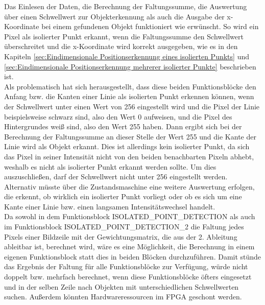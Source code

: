 \documentclass[ngerman,12pt]{article} %
\begin{document}
{Das Einlesen der Daten, die Berechnung der Faltungssumme, die Auswertung über einen Schwellwert zur Objekterkennung als auch die Ausgabe der x-Koordinate bei einem gefundenen Objekt funktioniert wie erwünscht. So wird ein Pixel als isolierter Punkt erkannt, wenn die Faltungssumme den Schwellwert überschreitet und die x-Koordinate wird korrekt ausgegeben, wie es in den Kapiteln \ref{sec:Eindimensionale Positionserkennung eines isolierten Punkts} und \ref{sec:Eindimensionale Positionserkennung mehrerer isolierter Punkte} beschrieben ist.\\
Als problematisch hat sich herausgestellt, dass diese beiden Funktionsblöcke den Anfang bzw. die Kanten einer Linie als isolierten Punkt erkennen können, wenn der Schwellwert unter einen Wert von 256 eingestellt wird und die Pixel der Linie beispielsweise schwarz sind, also den Wert 0 aufweisen, und die Pixel des Hintergrundes weiß sind, also den Wert 255 haben. Dann ergibt sich bei der Berechnung der Faltungssumme an dieser Stelle der Wert 255 und die Kante der Linie wird als Objekt erkannt. Dies ist allerdings kein isolierter Punkt, da sich das Pixel in seiner Intensität nicht von den beiden benachbarten Pixeln abhebt, weshalb es nicht als isolierter Punkt erkannt werden sollte. Um dies auszuschließen, darf der Schwellwert nicht unter 256 eingestellt werden. Alternativ müsste über die Zustandsmaschine eine weitere Auswertung erfolgen, die erkennt, ob wirklich ein isolierter Punkt vorliegt oder ob es sich um eine Kante einer Linie bzw. einen langsamen Intensitätswechsel handelt.\\
Da sowohl in dem Funktionsblock ISOLATED\_POINT\_DETECTION als auch im Funktionsblock ISOLATED\_POINT\_DETECTION\_2 die Faltung jedes Pixels einer Bildzeile mit der Gewichtungsmatrix, die aus der 2. Ableitung ableitbar ist, berechnet wird, wäre es eine Möglichkeit, die Berechnung in einem eigenen Funktionsblock statt dies in beiden Blöcken durchzuführen. Damit stünde das Ergebnis der Faltung für alle Funktionsblöcke zur Verfügung, würde nicht doppelt bzw. mehrfach berechnet, wenn diese Funktionsblöcke öfters eingesetzt und in der selben Zeile nach Objekten mit unterschiedlichen Schwellwerten suchen. Außerdem könnten Hardwareressourcen im FPGA geschont werden.



}
\end{document}
